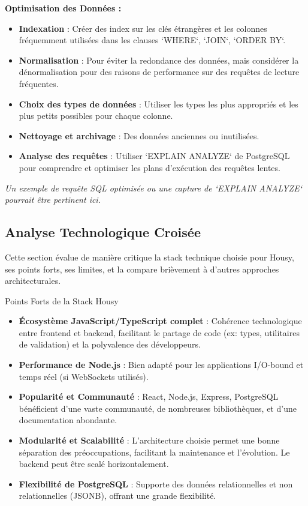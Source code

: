 \documentclass[11pt,a4paper]{report}
\begin{document}
\textbf{Optimisation des Données :}
\begin{itemize}[label=\textcolor{HousyGreen}{\textbullet}]
    \item \textbf{Indexation} : Créer des index sur les clés étrangères et les colonnes fréquemment utilisées dans les clauses `WHERE`, `JOIN`, `ORDER BY`.
    \item \textbf{Normalisation} : Pour éviter la redondance des données, mais considérer la dénormalisation pour des raisons de performance sur des requêtes de lecture fréquentes.
    \item \textbf{Choix des types de données} : Utiliser les types les plus appropriés et les plus petits possibles pour chaque colonne.
    \item \textbf{Nettoyage et archivage} : Des données anciennes ou inutilisées.
    \item \textbf{Analyse des requêtes} : Utiliser `EXPLAIN ANALYZE` de PostgreSQL pour comprendre et optimiser les plans d'exécution des requêtes lentes.
\end{itemize}
\textit{Un exemple de requête SQL optimisée ou une capture de `EXPLAIN ANALYZE` pourrait être pertinent ici.}

\subsection{Analyse Technologique Croisée}
\label{ssec:analyse_croisee}
Cette section évalue de manière critique la stack technique choisie pour Housy, ses points forts, ses limites, et la compare brièvement à d'autres approches architecturales.

\begin{tipbox}{Points Forts de la Stack Housy}
\begin{itemize}
    \item \textbf{Écosystème JavaScript/TypeScript complet} : Cohérence technologique entre frontend et backend, facilitant le partage de code (ex: types, utilitaires de validation) et la polyvalence des développeurs.
    \item \textbf{Performance de Node.js} : Bien adapté pour les applications I/O-bound et temps réel (si WebSockets utilisés).
    \item \textbf{Popularité et Communauté} : React, Node.js, Express, PostgreSQL bénéficient d'une vaste communauté, de nombreuses bibliothèques, et d'une documentation abondante.
    \item \textbf{Modularité et Scalabilité} : L'architecture choisie permet une bonne séparation des préoccupations, facilitant la maintenance et l'évolution. Le backend peut être scalé horizontalement.
    \item \textbf{Flexibilité de PostgreSQL} : Supporte des données relationnelles et non relationnelles (JSONB), offrant une grande flexibilité.
\end{itemize}
\end{tipbox}
\end{document}
